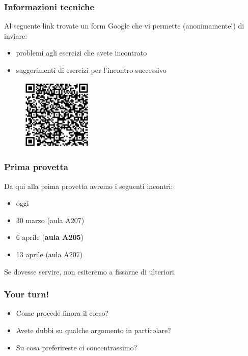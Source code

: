 \documentclass{beamer}
\begin{document}
\begin{frame}[fragile]
	\frametitle{Informazioni tecniche}
	
	Al seguente link trovate un form Google che vi permette (anonimamente!) di inviare:
	
	\begin{itemize}
	    \item problemi agli esercizi che avete incontrato
	    \item suggerimenti di esercizi per l'incontro successivo
	\end{itemize}
	
	\begin{figure}
	    \centering
	    \includegraphics[width=0.3\textwidth]{../drawable/logos/qr.png}
	\end{figure}
    
\end{frame} 

\begin{frame}[fragile]
	\frametitle{Prima provetta}
	
	Da qui alla prima provetta avremo i seguenti incontri:
	
	\begin{itemize}
	    \item oggi
	    \item 30 marzo (aula A207)
	    \item 6 aprile (\textbf{aula A205})
	    \item 13 aprile (aula A207)
	\end{itemize}
	
	\medskip
	
	Se dovesse servire, non esiteremo a fissarne di ulteriori.
	
    
\end{frame} 

\begin{frame}[fragile]
	\frametitle{Your turn!}
	
	\begin{itemize}
	    \item Come procede finora il corso?
	    \item Avete dubbi su qualche argomento in particolare?
	    \item Su cosa preferireste ci concentrassimo?
	\end{itemize}
    
\end{frame} 
\end{document}

